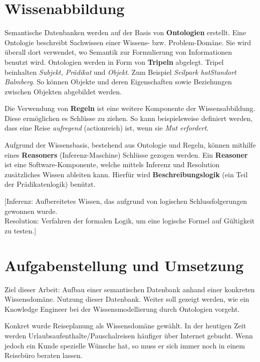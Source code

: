 \documentclass[
    paper=a4,               %
    fontsize=10pt,          %
    open=right,             %
    titlepage=false,        %
    parskip=half,           %
]{scrreprt}                 %
\begin{document}
    \begin{multicols}{3}
        \section*{Wissenabbildung}
        Semantische Datenbanken werden auf der Basis von \textbf{Ontologien} erstellt. Eine Ontologie beschreibt Sachwissen einer Wissens- bzw. Problem-Domäne. Sie wird überall dort verwendet, wo Semantik zur Formulierung von Informationen benutzt wird. Ontologien werden in Form von \textbf{Tripeln} abgelegt. Tripel beinhalten \textit{Subjekt, Prädikat} und \textit{Objekt}. Zum Beispiel \textit{Seilpark hatStandort Balmberg}. So können Objekte und deren Eigenschaften sowie Beziehungen zwischen Objekten abgebildet werden.

        Die Verwendung von \textbf{Regeln} ist eine weitere Komponente der Wissensabbildung. Diese ermöglichen es Schlüsse zu ziehen. So kann beispielsweise definiert werden, dass eine Reise \textit{aufregend} (actionreich) ist, wenn sie \textit{Mut erfordert}.

        Aufgrund der Wissensbasis, bestehend aus Ontologie und Regeln, können mithilfe eines \textbf{Reasoners} (Inferenz-Maschine) Schlüsse gezogen werden.
        Ein \textbf{Reasoner} ist eine Software-Komponente, welche mittels Inferenz und Resolution zusätzliches Wissen ableiten kann. Hierfür wird \textbf{Beschreibungslogik} (ein Teil der Prädikatenlogik) benützt.

        {[}Inferenz: Aufbereitetes Wissen, das aufgrund von logischen Schlussfolgerungen gewonnen wurde.\\
        Resolution: Verfahren der formalen Logik, um eine logische Formel auf Gültigkeit zu testen.{]}

        \section*{Aufgabenstellung und Umsetzung}
        Ziel dieser Arbeit:  Aufbau einer semantischen Datenbank anhand einer konkreten Wissensdomäne.  Nutzung dieser Datenbank. Weiter soll gezeigt werden, wie ein Knowledge Engineer bei der Wissensmodellierung durch Ontologien vorgeht.

        Konkret wurde Reiseplanung als Wissensdomäne gewählt. In der heutigen Zeit werden Urlaubsaufenthalte/Pauschalreisen häufiger über Internet gebucht. Wenn jedoch ein Kunde spezielle Wünsche hat, so muss er sich immer noch in einem Reisebüro beraten lassen. 


\end{multicols}
\end{document}
